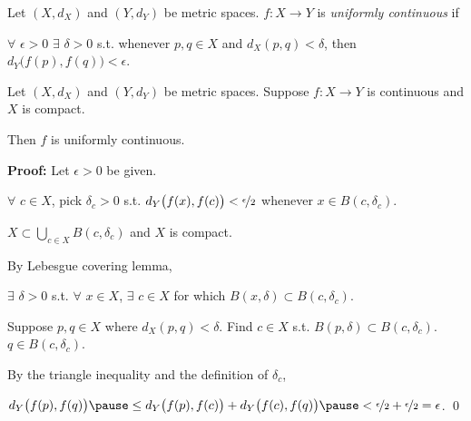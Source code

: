\documentclass[10pt,aspectratio=169]{beamer}
\begin{document}
\begin{frame}

\begin{definition}
Let $(X,d_X)$ and $(Y,d_Y)$ be metric spaces.
$f \colon X \to Y$ is
\emph{uniformly continuous} if

\pause
$\forall$ $\epsilon > 0$
$\exists$ $\delta > 0$ s.t. whenever $p,q \in X$ and
$d_X(p,q) < \delta$, then
$d_Y\bigl(f(p),f(q)\bigr) < \epsilon$.
\end{definition}

\pause
\begin{theorem}
Let $(X,d_X)$ and $(Y,d_Y)$ be metric spaces.
Suppose $f \colon X \to Y$ is continuous and $X$ is compact.

\pause
Then $f$ is uniformly continuous.
\end{theorem}

\pause
\textbf{Proof:}
Let $\epsilon > 0$ be given.

\pause
$\forall$ $c \in X$,
pick $\delta_c > 0$ s.t.
$d_Y\bigl(f(x),f(c)\bigr) < \nicefrac{\epsilon}{2}$
whenever
$x \in B(c,\delta_c)$.

\pause
$X \subset \bigcup_{c \in X} B(c,\delta_c)$ and $X$ is compact.  

\pause
By Lebesgue covering lemma,

$\exists$ $\delta > 0$
s.t. $\forall$ $x \in X$,
$\exists$ $c \in X$
for which $B(x,\delta) \subset B(c,\delta_c)$.

\pause
\medskip

Suppose $p, q \in X$ where $d_X(p,q) < \delta$.
Find $c \in X$ s.t. $B(p,\delta) \subset B(c,\delta_c)$.
\pause
\wthus $q \in B(c,\delta_c)$.

\medskip
\pause
By the triangle inequality
and the definition of $\delta_c$,


$
d_Y\bigl(f(p),f(q)\bigr)
\pause
\leq
d_Y\bigl(f(p),f(c)\bigr)
+
d_Y\bigl(f(c),f(q)\bigr)
\pause
<
\nicefrac{\epsilon}{2}+
\nicefrac{\epsilon}{2} = \epsilon$.
\qed

\end{frame}
\end{document}
